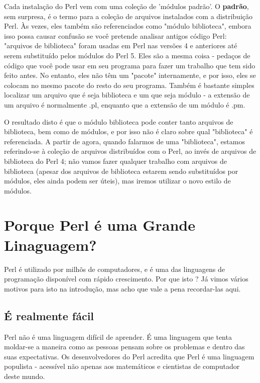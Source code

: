 \documentclass[a4paper,11pt]{book}
\begin{document}
\noindent 

\noindent Cada instalação do Perl vem com uma coleção de 'módulos padrão'. O \textbf{padrão}, sem surpresa, é o termo para a cole\c{c}ão de arquivos instalados com a distribuição Perl. Às vezes, eles também são referenciados como "módulo biblioteca", embora isso possa causar confusão se você pretende analisar antigos código Perl: "arquivos de biblioteca" foram usadas em Perl nas versões 4 e anteriores até serem substituído pelos módulos do Perl 5. Eles são a mesma coisa - pedaços de código que você pode usar em seu programa para fazer um trabalho que tem sido feito antes. No entanto, eles não têm um "pacote" internamente, e por isso, eles se colocam no mesmo pacote do resto do seu programa. Também é bastante simples localizar um arquivo que é seja biblioteca e um que seja módulo - a extensão de um arquivo é normalmente .pl, enquanto que a extensão de um módulo é .pm.

\noindent 

\noindent O resultado disto é que o módulo biblioteca pode conter tanto arquivos de biblioteca, bem como de módulos, e por isso não é claro sobre qual "biblioteca" é referenciada. A partir de agora, quando falarmos de uma "biblioteca", estamos referindo-se à coleção de arquivos distribuídos com o Perl, ao invés de arquivos de biblioteca do Perl 4; não vamos fazer qualquer trabalho com arquivos de biblioteca (apesar dos arquivos de biblioteca estarem sendo substituídos por módulos, eles ainda podem ser úteis), mas iremos utilizar o novo estilo de módulos.

\noindent 

\section{Porque Perl é uma Grande Linaguagem?}

\noindent Perl é utilizado por milhõs de computadores, e é uma das linguagens de programação disponível com rápido crescimento. Por que isto ? Já vimos vários motivos para isto na introdução, mas acho que vale a pena recordar-las aqui.

\subsection{É realmente fácil}

\noindent Perl não é uma linguagem difícil de aprender. É uma linguagem que tenta moldar-se a maneira como as pessoas pensam sobre os problemas e dentro das suas expectativas. Os desenvolvedores do Perl acredita que Perl é uma linguagem populista - acessível não apenas aos matemáticos e cientistas de computador deste mundo.
\end{document}
